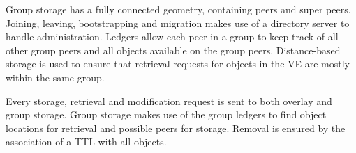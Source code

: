 Group storage has a fully connected geometry, containing peers and super peers. Joining, leaving, bootstrapping and migration makes use of a directory server to handle administration. Ledgers allow each peer in a group to keep track of all other group peers and all objects available on the group peers. Distance-based storage is used to ensure that retrieval requests for objects in the VE are mostly within the same group.

Every storage, retrieval and modification request is sent to both overlay and group storage. Group storage makes use of the group ledgers to find object locations for retrieval and possible peers for storage. Removal is ensured by the association of a TTL with all objects.
